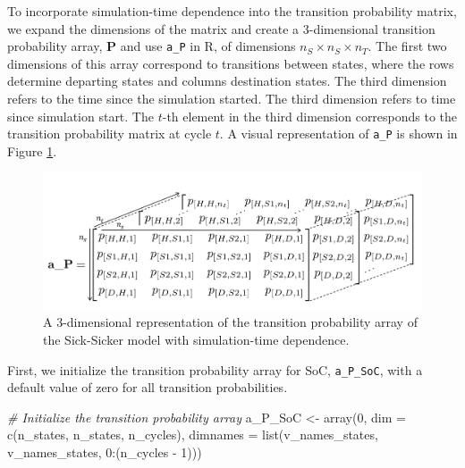 \documentclass[
]{article}
\newenvironment{Shaded}{\begin{snugshade}}{\end{snugshade}}
\newcommand{\AttributeTok}[1]{\textcolor[rgb]{0.77,0.63,0.00}{#1}}
\newcommand{\CommentTok}[1]{\textcolor[rgb]{0.56,0.35,0.01}{\textit{#1}}}
\newcommand{\DecValTok}[1]{\textcolor[rgb]{0.00,0.00,0.81}{#1}}
\newcommand{\FunctionTok}[1]{\textcolor[rgb]{0.00,0.00,0.00}{#1}}
\newcommand{\NormalTok}[1]{#1}
\newcommand{\OtherTok}[1]{\textcolor[rgb]{0.56,0.35,0.01}{#1}}
\newcommand{\SpecialCharTok}[1]{\textcolor[rgb]{0.00,0.00,0.00}{#1}}
\begin{document}
To incorporate simulation-time dependence into the transition probability matrix, we expand the dimensions of the matrix and create a 3-dimensional transition probability array, \(\mathbf{P}\) and use \texttt{a\_P} in R, of dimensions \(n_S \times n_S \times n_T\). The first two dimensions of this array correspond to transitions between states, where the rows determine departing states and columns destination states. The third dimension refers to the time since the simulation started. The third dimension refers to time since simulation start. The \(t\)-th element in the third dimension corresponds to the transition probability matrix at cycle \(t\). A visual representation of \texttt{a\_P} is shown in Figure \ref{fig:Array-Time-Dependent}.

\begin{figure}[H]

{\centering \includegraphics[width=1\linewidth]{figs/Figure 2 - 3D-state-transition-array-sick-sicker-without-tunnels} 

}

\caption{A 3-dimensional representation of the transition probability array of the Sick-Sicker model with simulation-time dependence.}\label{fig:Array-Time-Dependent}
\end{figure}

First, we initialize the transition probability array for SoC, \texttt{a\_P\_SoC}, with a default value of zero for all transition probabilities.

\begin{Shaded}
\begin{Highlighting}[]
\CommentTok{\# Initialize the transition probability array}
\NormalTok{a\_P\_SoC }\OtherTok{\textless{}{-}} \FunctionTok{array}\NormalTok{(}\DecValTok{0}\NormalTok{, }\AttributeTok{dim =} \FunctionTok{c}\NormalTok{(n\_states, n\_states, n\_cycles),}
              \AttributeTok{dimnames =} \FunctionTok{list}\NormalTok{(v\_names\_states, v\_names\_states, }\DecValTok{0}\SpecialCharTok{:}\NormalTok{(n\_cycles }\SpecialCharTok{{-}} \DecValTok{1}\NormalTok{)))}
\end{Highlighting}
\end{Shaded}
\end{document}
